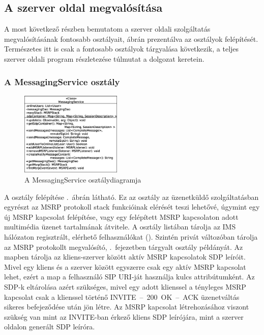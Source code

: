 \newpage
\newpage

\subsection{A szerver oldal megvalósítása}

A most következő részben bemutatom a szerver oldali szolgáltatás megvalósításának fontosabb osztályait, ábrán prezentálva az osztályok felépítését. Természetes itt is csak a fontosabb osztályok tárgyalása következik, a teljes szerver oldali program részletezése túlmutat a dolgozat keretein.

\subsubsection*{A MessagingService osztály}
\label{sec:server_messagingservice}

\begin{figure}
  \vspace{-15pt}
  \begin{center}
    \includegraphics[width=0.43\textwidth]{img/class_diagrams/server/eps/MessagingService.eps}
  \end{center}
  \vspace{-15pt}
  \captionsetup{font=scriptsize}
  \caption{A MessagingService osztálydiagramja}
   \label{fig:class_server_messagingservice}
  \vspace{-10pt}
\end{figure}

A  osztály felépítése .~ábrán látható. Ez az osztály az üzenetküldő szolgáltatásban egyrészt az MSRP protokoll stack funkcióinak elérését teszi lehetővé, úgymint egy új MSRP kapcsolat felépítése, vagy egy felépített MSRP kapcsolaton adott multimédia üzenet tartalmának átvitele. A  osztály listában tárolja az IMS hálózaton regisztrált, elérhető felhasználókat (). Szintén privát változóban tárolja az MSRP protokollt megvalósító, .~fejezetben tárgyalt  osztály példányát. Az  mapben tárolja az kliens-szerver között aktív MSRP kapcsolatok SDP leíróit. Mivel egy kliens és a szerver között egyszerre csak egy aktív MSRP kapcsolat lehet, ezért a map a felhasználó SIP URI-ját használja kulcs attribútumként. Az SDP-k eltárolása azért szükséges, mivel egy adott klienssel a tényleges MSRP kapcsolat csak a klienssel történő INVITE~--~200~OK~--~ACK üzenetváltás sikeres befejeződése után jön létre. Az MSRP kapcsolat létrehozásához viszont szükség van mint az INVITE-ban érkező kliens SDP leírójára, mint a szerver oldalon generált SDP leíróra.

